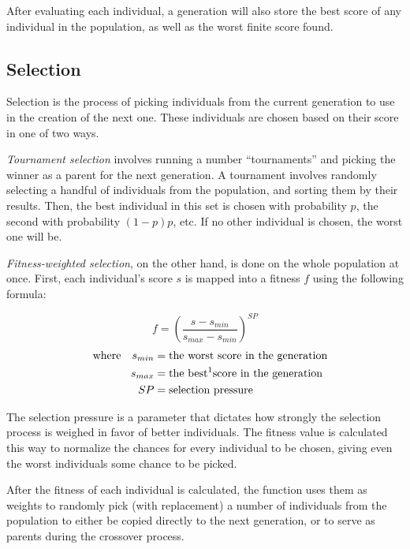 \documentclass{report}
\begin{document}
After evaluating each individual, a generation will also store the best score of any individual in the population, as well as the worst finite score found.

\subsection{Selection}

Selection is the process of picking individuals from the current generation to use in the creation of the next one. These individuals are chosen based on their score in one of two ways.

\emph{Tournament selection} involves running a number ``tournaments'' and picking the winner as a parent for the next generation. A tournament involves randomly selecting a handful of individuals from the population, and sorting them by their results. Then, the best individual in this set is chosen with probability \label{tournament_p}$p$, the second with probability $(1-p)p$, etc. If no other individual is chosen, the worst one will be.

\emph{Fitness-weighted selection}, on the other hand, is done on the whole population at once. First, each individual's score $s$ is mapped into a fitness $f$ using the following formula:

$$f = \left(\frac{s - s_{min}}{s_{max} - s_{min}}\right)^{SP}$$
\begin{align*}\quad
    \text{where}\quad
    s_{min} &= \text{the worst score in the generation}\\
    s_{max} &= \text{the best\footnotemark score in the generation}\\
    SP &= \text{selection pressure}
\end{align*}


The selection pressure is a parameter that dictates how strongly the selection process is weighed in favor of better individuals. The fitness value is calculated this way to normalize the chances for every individual to be chosen, giving even the worst individuals some chance to be picked.

After the fitness of each individual is calculated, the function uses them as weights to randomly pick (with replacement) a number of individuals from the population to either be copied directly to the next generation, or to serve as parents during the crossover process.
\end{document}
